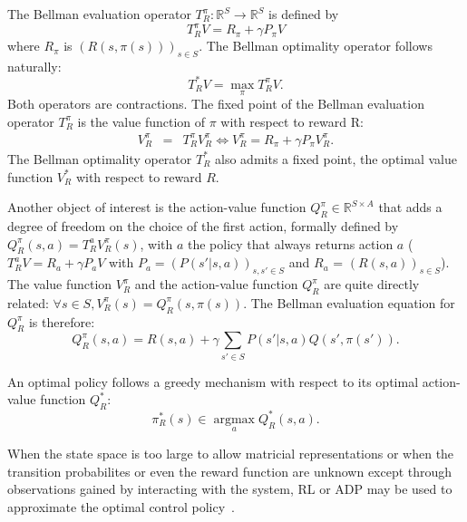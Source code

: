 \documentclass[smallextended]{svjour3}
\newcommand{\argmax}{\operatorname*{argmax}} %
\begin{document}
The Bellman evaluation operator $T^\pi_R: \mathbb{R}^{S} \rightarrow  \mathbb{R}^{S}$ is defined by
\begin{equation}
  T^{\pi}_RV = R_\pi + \gamma P_\pi V
  \end{equation}
where $R_\pi$ is $(R(s,\pi(s)))_{s\in S}$. The Bellman optimality operator follows naturally:
\begin{equation}
  T^*_RV = \max_\pi T^\pi_RV.
\end{equation}
  Both operators are contractions. The fixed point of the Bellman evaluation operator $T^\pi_R$ is the value function of $\pi$ with respect to reward R:
  \begin{eqnarray}
    V^\pi_R &=& T^\pi_R V^\pi_R \Leftrightarrow V^\pi_R = R_\pi + \gamma P_\pi V^\pi_R.
  \end{eqnarray}
The Bellman optimality operator $T^*_R$ also admits a fixed point, the optimal value function $V_R^*$ with respect to reward $R$.

Another object of interest is the action-value function $Q^\pi_R\in\mathbb{R}^{S\times A}$ that adds a degree of freedom on the choice of the first action, formally defined by $Q^\pi_R(s,a) = T^a_RV^\pi_R(s)$, with $a$ the policy that always returns action $a$ ($T^a_RV = R_a + \gamma P_a V$ with $P_a = (P(s'|s,a))_{s,s' \in S}$ and $R_a$ = $(R(s,a))_{s\in S}$). The value function $V^\pi_R$ and the action-value function $Q^\pi_R$ are quite directly related: $\forall s \in S, V^\pi_R(s) = Q^\pi_R(s,\pi(s))$. The Bellman evaluation equation for $Q^\pi_R$ is therefore:
\begin{equation}
  Q^\pi_R(s,a) = R(s,a) + \gamma \sum_{s'\in S}P(s'|s,a) Q(s',\pi(s')).
  \label{eq:bellman1}
\end{equation}

An optimal policy follows a greedy mechanism with respect to its optimal action-value function $Q^*_R$:
\begin{equation}
  \label{eq:greedy}
  \pi^*_R(s)\in\argmax_aQ^*_R(s,a).
\end{equation}

When the state space is too large to allow matricial representations or when the transition probabilites or even the reward function are unknown except through observations gained by interacting with the system, RL or ADP may be used to approximate the optimal control policy~\cite{sutton1998reinforcement}.
\end{document}
